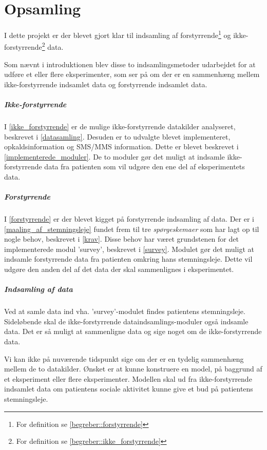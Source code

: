 \chapter{Opsamling}
I dette projekt er der blevet gjort klar til indsamling af forstyrrende\footnote{For definition se \cref{begreber::forstyrrende}} og ikke-forstyrrende\footnote{For definition se \cref{begreber::ikke_forstyrrende}} data. 

Som nævnt i introduktionen blev disse to indsamlingsmetoder udarbejdet for at udføre et eller flere eksperimenter, som ser på om der er en sammenhæng mellem ikke-forstyrrende indsamlet data og forstyrrende indsamlet data.

\paragraph{Ikke-forstyrrende}
I \cref{ikke_forstyrrende} er de mulige ikke-forstyrrende datakilder analyseret, beskrevet i \cref{datasamling}.
Desuden er to udvalgte blevet implementeret, opkaldsinformation og SMS/MMS information.
Dette er blevet beskrevet i \cref{implementerede_moduler}.
De to moduler gør det muligt at indsamle ikke-forstyrrende data fra patienten som vil udgøre den ene del af eksperimentets data.

\paragraph{Forstyrrende}
I \cref{forstyrrende} er der blevet kigget på forstyrrende indsamling af data.
Der er i \cref{maaling_af_stemningsleje} fundet frem til tre \textit{spørgeskemaer} som har lagt op til nogle behov, beskrevet i \cref{krav}.
Disse behov har været grundstenen for det implementerede modul 'survey', beskrevet i \cref{survey}.
Modulet gør det muligt at indsamle forstyrrende data fra patienten omkring hans stemningsleje.
Dette vil udgøre den anden del af det data der skal sammenlignes i eksperimentet.

\paragraph{Indsamling af data}
Ved at samle data ind vha. 'survey'-modulet findes patientens stemningsleje.
Sideløbende skal de ikke-forstyrrende dataindsamlings-moduler også indsamle data.
Det er så muligt at sammenligne data og sige noget om de ikke-forstyrrende data.

Vi kan ikke på nuværende tidspunkt sige om der er en tydelig sammenhæng mellem de to datakilder. 
Ønsket er at kunne konstruere en model, på baggrund af et eksperiment eller flere eksperimenter.
Modellen skal ud fra ikke-forstyrrende indsamlet data om patientens sociale aktivitet kunne give et bud på patientens stemningsleje.